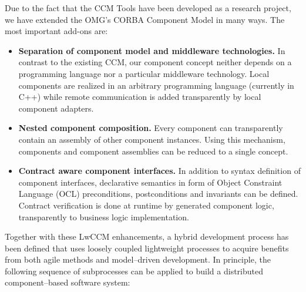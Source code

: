 Due to the fact that the CCM Tools have been developed as a research project,
we have extended the OMG's CORBA Component Model in many ways.
The most important add-ons are:
\begin{itemize}
\item  {\bf Separation of component model and middleware technologies.} 
  In contrast to the existing CCM, our component concept neither
  depends on a programming language nor a particular middleware
  technology.
  Local components are realized in an arbitrary programming language
  (currently in C++) while remote communication is added transparently 
  by local component adapters.

\item {\bf Nested component composition.}      
  Every component can transparently contain an assembly of other component 
  instances. Using this mechanism, components and component assemblies 
  can be reduced to a single concept.
  
\item {\bf Contract aware component interfaces.}
  In addition to syntax definition of component interfaces,
  declarative semantics in form of Object Constraint Language (OCL) 
  preconditions, postconditions and invariants can be defined.
  Contract verification is done at runtime by generated component logic,
  transparently to business logic implementation.
\end{itemize}

Together with these LwCCM enhancements, a hybrid development process has been 
defined that uses loosely coupled lightweight processes to acquire benefits 
from both agile methods and model--driven development.
In principle, the following sequence of subprocesses can be applied to build a
distributed component--based software system: 

